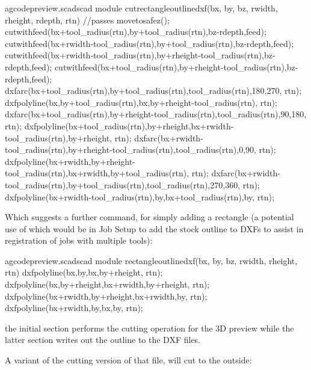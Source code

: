 \documentclass{ltxdoc}
\begin{document}
\lstset{firstnumber=\thegcpscad}
\begin{writecode}{a}{gcodepreview.scad}{scad}
module cutrectangleoutlinedxf(bx, by, bz, rwidth, rheight, rdepth, rtn) {//passes
  movetosafez();
  cutwithfeed(bx+tool_radius(rtn),by+tool_radius(rtn),bz-rdepth,feed);
  cutwithfeed(bx+rwidth-tool_radius(rtn),by+tool_radius(rtn),bz-rdepth,feed);
  cutwithfeed(bx+rwidth-tool_radius(rtn),by+rheight-tool_radius(rtn),bz-rdepth,feed);
  cutwithfeed(bx+tool_radius(rtn),by+rheight-tool_radius(rtn),bz-rdepth,feed);
  dxfarc(bx+tool_radius(rtn),by+tool_radius(rtn),tool_radius(rtn),180,270, rtn);
  dxfpolyline(bx,by+tool_radius(rtn),bx,by+rheight-tool_radius(rtn), rtn);
  dxfarc(bx+tool_radius(rtn),by+rheight-tool_radius(rtn),tool_radius(rtn),90,180, rtn);
  dxfpolyline(bx+tool_radius(rtn),by+rheight,bx+rwidth-tool_radius(rtn),by+rheight, rtn);
  dxfarc(bx+rwidth-tool_radius(rtn),by+rheight-tool_radius(rtn),tool_radius(rtn),0,90, rtn);
  dxfpolyline(bx+rwidth,by+rheight-tool_radius(rtn),bx+rwidth,by+tool_radius(rtn), rtn);
  dxfarc(bx+rwidth-tool_radius(rtn),by+tool_radius(rtn),tool_radius(rtn),270,360, rtn);
  dxfpolyline(bx+rwidth-tool_radius(rtn),by,bx+tool_radius(rtn),by, rtn);
}

\end{writecode}
\addtocounter{gcpscad}{16}

Which suggests a further command,  for simply adding a rectangle (a potential use of which would be in Job Setup to add the stock outline to DXFs to assist in registration of jobs with multiple tools):

\lstset{firstnumber=\thegcpscad}
\begin{writecode}{a}{gcodepreview.scad}{scad}
module rectangleoutlinedxf(bx, by, bz, rwidth, rheight, rtn) {
  dxfpolyline(bx,by,bx,by+rheight, rtn);
  dxfpolyline(bx,by+rheight,bx+rwidth,by+rheight, rtn);
  dxfpolyline(bx+rwidth,by+rheight,bx+rwidth,by, rtn);
  dxfpolyline(bx+rwidth,by,bx,by, rtn);
}

\end{writecode}
\addtocounter{gcpscad}{7}

\noindent the initial section performs the cutting operation for the 3D preview while the latter section writes out the outline to the DXF files.

A variant of the  cutting version of that file,  will cut to the outside:
\end{document}
